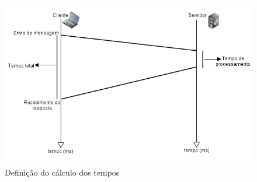 \documentclass[a4paper,10pt]{article}
\begin{document}
\begin{figure}[!htb]
  \centering
  \label{fluxotempo}
  \includegraphics[scale=0.5]{fluxo_tempo.png}
  \caption{Definição do cálculo dos tempos}
\end{figure}
\end{document}
